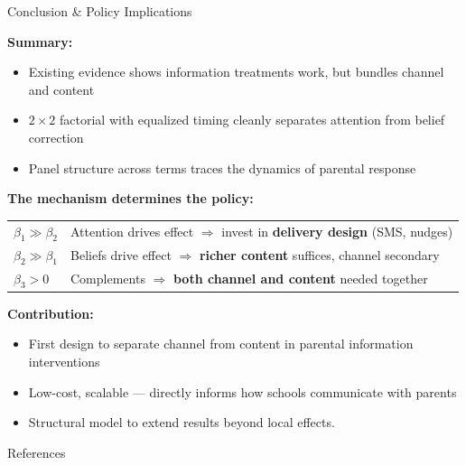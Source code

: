 \documentclass[aspectratio=169,11pt]{beamer}
\begin{document}
\begin{frame}{Conclusion \& Policy Implications}

\textbf{Summary:}
\begin{itemize}
    \item Existing evidence shows information treatments work, but bundles channel and content
    \item $2 \times 2$ factorial with equalized timing cleanly separates attention from belief correction
    \item Panel structure across terms traces the dynamics of parental response
\end{itemize}

\bigskip

\textbf{The mechanism determines the policy:}

\medskip

\begin{tabular}{@{}ll@{}}
$\beta_1 \gg \beta_2$ & Attention drives effect $\Rightarrow$ invest in \textbf{delivery design} (SMS, nudges) \\[4pt]
$\beta_2 \gg \beta_1$ & Beliefs drive effect $\Rightarrow$ \textbf{richer content} suffices, channel secondary \\[4pt]
$\beta_3 > 0$         & Complements $\Rightarrow$ \textbf{both channel and content} needed together \\
\end{tabular}

\bigskip

\textbf{Contribution:}
\begin{itemize}
    \item First design to separate channel from content in parental information interventions
    \item Low-cost, scalable --- directly informs how schools communicate with parents
    \item Structural model to extend results beyond local effects. 
\end{itemize}

\end{frame}


\begin{frame}[allowframebreaks]{References}
\footnotesize


\end{frame}
\end{document}
